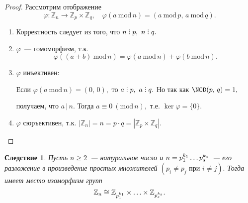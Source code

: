 \documentclass[a4paper, 14pt]{extarticle}
\newcommand{\n}{\par}
\newcommand{\integers}{\mathbb{Z}}
\DeclareRobustCommand{\divby}{%
	\mathrel{\text{\vbox{\baselineskip.65ex\lineskiplimit0pt\hbox{.}\hbox{.}\hbox{.}}}}%
}
\renewcommand{\phi}{\varphi}
\renewcommand{\mod}{\mathrm{mod} \,}
\theoremstyle{definition}
\theoremstyle{plain}
\numberwithin{theorem}{section}
\numberwithin{definition}{section}
\numberwithin{statement}{section}
\numberwithin{lemma}{section}
\newtheorem*{consequence*}{Следствие}
\numberwithin{consequence}{section}
\begin{document}
	\begin{proof}
		Рассмотрим отображение
		\begin{equation*}
			\phi: \integers_n \rightarrow \integers_p \times \integers_q, \quad \phi(a \ \mod n) = (a \ \mod p, \, a \ \mod q).
		\end{equation*}
		\begin{enumerate}
			\setlength\itemsep{0.1em}
			\item Корректность следует из того, что $n \divby p, \ n \divby q.$
			\item $\phi$~--- гомоморфизм, т.к.
			\begin{equation*}
				\phi((a + b) \ \mod n) = \phi(a \ \mod n) + \phi(b \ \mod n).
			\end{equation*}
			\item $\phi$ инъективен: \n
			Если ${\phi(a \ \mod n) =(0, \, 0),}$ то ${a \divby p, \ a \divby q.}$ Но так как ${\NOD(p, \, q) = 1,}$ \n
			получаем, что $a \, | \, n.$ Тогда ${a \equiv 0 \ (\mod n),}$ т.е. ${\ker \phi = \{0\}.}$
			\item $\phi$ сюръективен, т.к. ${|\integers_n| = n = p \cdot q = |\integers_p \times \integers_q|.}$ \qedhere
		\end{enumerate}
	\end{proof}
	\begin{consequence*}
		Пусть ${n \geqslant 2}$~--- натуральное число и ${n = p^{k_1}_1 \mathellipsis p^{k_s}_s}$~--- его разложение в произведение простых множителей ${(p_i \neq p_j \text{ при } i \neq j).}$ Тогда имеет место изоморфизм групп
		\begin{equation*}
			\integers_n \cong \integers_{p^{k_1}_1} \times \mathellipsis \times \integers_{p^{k_s}_s}.
		\end{equation*}
	\end{consequence*}
        \newpage
\end{document}
